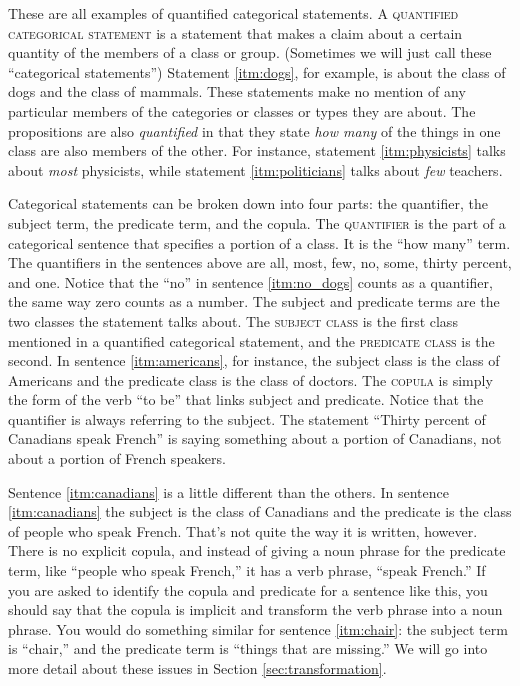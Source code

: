 These are all examples of quantified categorical statements. A  \textsc{\gls{quantified categorical statement}} \label{def:quantified_categorical_statement} is a statement that makes a claim about a certain quantity of the members of a class or group. (Sometimes we will just call these ``categorical statements'') Statement \ref{itm:dogs}, for example, is about the class of dogs and the class of mammals. These statements make no mention of any particular members of the categories or classes or types they are about. The propositions are also \textit{quantified} in that they state \textit{how many} of the things in one class are also members of the other. For instance, statement \ref{itm:physicists} talks about \textit{most} physicists, while statement \ref{itm:politicians} talks about \textit{few} teachers.

Categorical statements can be broken down into four parts: the quantifier, the subject term, the predicate term, and the copula. The \textsc{\gls{quantifier}} \label{def:quantifier} is the part of a categorical sentence that specifies a portion of a class. It is the ``how many'' term. The quantifiers in the sentences above are all, most, few, no, some, thirty percent, and one. Notice that the ``no'' in sentence \ref{itm:no_dogs} counts as a quantifier, the same way zero counts as a number. The subject and predicate terms are the two classes the statement talks about. The \textsc{\gls{subject class}} \label{def:subject_class} is the first class mentioned in a quantified categorical statement, and the \textsc{\gls{predicate class}} \label{def:predicate_class} is the second. In sentence \ref{itm:americans}, for instance, the subject class is the class of Americans and the predicate class is the class of doctors.  The \textsc{\gls{copula}} \label{def:copula} is simply the form of the verb ``to be'' that links subject and predicate. Notice that the quantifier is always referring to the subject. The statement ``Thirty percent of Canadians speak French'' is saying something about a portion of Canadians, not about a portion of French speakers.

Sentence \ref{itm:canadians} is a little different than the others. In sentence \ref{itm:canadians} the subject is the class of Canadians and the predicate is the class of people who speak French. That's not quite the way it is written, however. There is no explicit copula, and instead of giving a noun phrase for the predicate term, like ``people who speak French,'' it has a verb phrase, ``speak French.'' If you are asked to identify the copula and predicate for a sentence like this, you should say that the copula is implicit and transform the verb phrase into a noun phrase. You would do something similar for sentence \ref{itm:chair}: the subject term is ``chair,'' and the predicate term is ``things that are missing.'' We will go into more detail about these issues in Section \ref{sec:transformation}.


